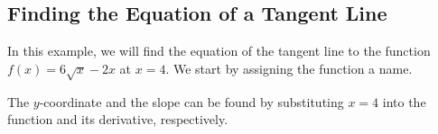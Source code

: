 \subsection{Finding the Equation of a Tangent Line}
\label{subsec:equation_of_tangent_line}
In this example, we will find the equation of the tangent line to the function $f(x)=6\sqrt{x} - 2x$ at $x=4$. We start by assigning the function a name.

\begin{maplegroup}
\begin{mapleinput}
\end{mapleinput}
\mapleresult
\begin{maplelatex}
\end{maplelatex}
\end{maplegroup}

\begin{maplegroup}
\begin{mapleinput}
\end{mapleinput}
\mapleresult
\begin{maplelatex}
\end{maplelatex}
\end{maplegroup}

The $y$-coordinate and the slope can be found by substituting $x=4$ into the function and its derivative, respectively.

\begin{maplegroup}
\begin{mapleinput}
\end{mapleinput}
\mapleresult
\begin{maplelatex}
\end{maplelatex}
\end{maplegroup}

